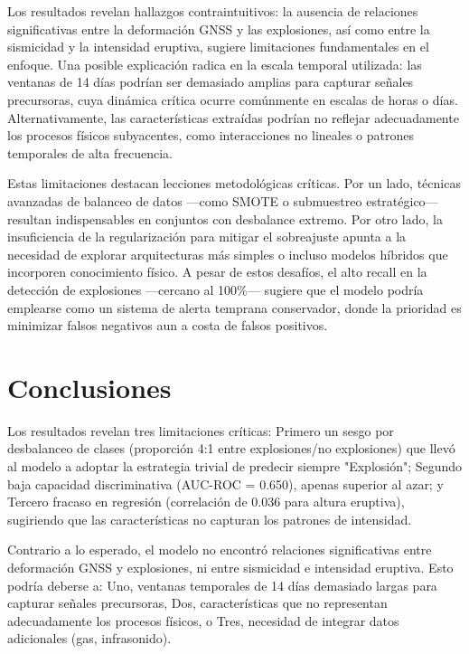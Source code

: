 \documentclass[11pt,a4paper]{article}
\begin{document}
Los resultados revelan hallazgos contraintuitivos: la ausencia de relaciones significativas entre la deformación GNSS y las explosiones, así como entre la sismicidad y la intensidad eruptiva, sugiere limitaciones fundamentales en el enfoque. Una posible explicación radica en la escala temporal utilizada: las ventanas de 14 días podrían ser demasiado amplias para capturar señales precursoras, cuya dinámica crítica ocurre comúnmente en escalas de horas o días. Alternativamente, las características extraídas podrían no reflejar adecuadamente los procesos físicos subyacentes, como interacciones no lineales o patrones temporales de alta frecuencia.  

Estas limitaciones destacan lecciones metodológicas críticas. Por un lado, técnicas avanzadas de balanceo de datos —como SMOTE o submuestreo estratégico— resultan indispensables en conjuntos con desbalance extremo. Por otro lado, la insuficiencia de la regularización para mitigar el sobreajuste apunta a la necesidad de explorar arquitecturas más simples o incluso modelos híbridos que incorporen conocimiento físico. A pesar de estos desafíos, el alto recall en la detección de explosiones —cercano al 100\%— sugiere que el modelo podría emplearse como un sistema de alerta temprana conservador, donde la prioridad es minimizar falsos negativos aun a costa de falsos positivos.  

\section{Conclusiones}
Los resultados revelan tres limitaciones críticas: Primero un sesgo por desbalanceo de clases (proporción 4:1 entre explosiones/no explosiones) que llevó al modelo a adoptar la estrategia trivial de predecir siempre "Explosión"; Segundo baja capacidad discriminativa (AUC-ROC = 0.650), apenas superior al azar; y Tercero fracaso en regresión (correlación de 0.036 para altura eruptiva), sugiriendo que las características no capturan los patrones de intensidad.

Contrario a lo esperado, el modelo no encontró relaciones significativas entre deformación GNSS y explosiones, ni entre sismicidad e intensidad eruptiva. Esto podría deberse a: Uno, ventanas temporales de 14 días demasiado largas para capturar señales precursoras, Dos, características que no representan adecuadamente los procesos físicos, o Tres, necesidad de integrar datos adicionales (gas, infrasonido).
\end{document}
